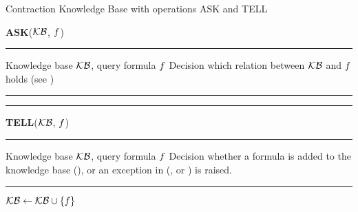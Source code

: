 \begin{algorithm}[hbt!]
    \caption{Contraction Knowledge Base with operations ASK and TELL}\label{alg:contractionKB}
    \vspace{0.3cm} \textbf{ASK}($\mathcal{KB}$, $f$)
    \begin{algorithmic}
    \hrule
    \Require Knowledge base $\mathcal{KB}$, query formula $f$
    \Ensure Decision which relation between $\mathcal{KB}$ and $f$ holds (see )
    \hrule
        \State{$\hypercoreat{\formulavar} \algdefsymbol \contractionof{\{\secexformulaat{\shortcatvariables} \, : \, \secexformula\in\kb\},\rencodingofat{\exformula}{\formulavar,\shortcatvariables}}{\formulavar}$}
            \State \Return {}
            \State \Return {}
            \State \Return {}
        \Else
            \State \Return {}
        \EndIf
    \hrule
    \end{algorithmic}
    \vspace{0.3cm} \textbf{TELL}($\mathcal{KB}$, $f$)
    \begin{algorithmic}
        \hrule
    \Require Knowledge base $\mathcal{KB}$, query formula $f$
    \Ensure Decision whether a formula is added to the knowledge base (), or an exception in (,  or ) is raised.
    \hrule
            \State \Return {}
            \State \Return {}
            \State \Return {}
            \State $\mathcal{KB} \leftarrow \mathcal{KB}\cup\{f\}$
            \State \Return {}
        \EndIf
    \end{algorithmic}

\end{algorithm}





